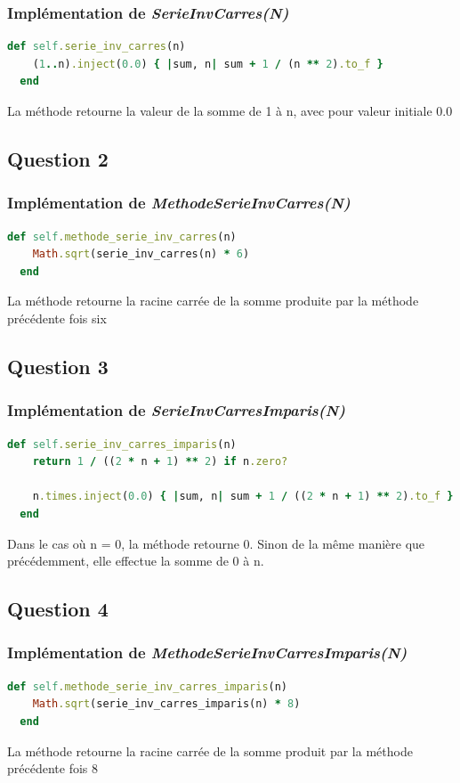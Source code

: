 \documentclass[a4paper,10pt]{report}
\begin{document}
\subsubsection{Implémentation de \textit{SerieInvCarres(N)}}
\begin{lstlisting}[language=Ruby]
  def self.serie_inv_carres(n)
    (1..n).inject(0.0) { |sum, n| sum + 1 / (n ** 2).to_f }
  end
\end{lstlisting}
La méthode retourne la valeur de la somme de 1 à n, avec pour valeur initiale 0.0
\bigskip

\subsection{Question 2}
\subsubsection{Implémentation de \textit{MethodeSerieInvCarres(N)}}
\begin{lstlisting}[language=Ruby]
  def self.methode_serie_inv_carres(n)
    Math.sqrt(serie_inv_carres(n) * 6)
  end
\end{lstlisting}
La méthode retourne la racine carrée de la somme produite par la méthode précédente fois six
\bigskip

\subsection{Question 3}
\subsubsection{Implémentation de \textit{SerieInvCarresImparis(N)}}
\begin{lstlisting}[language=Ruby]
  def self.serie_inv_carres_imparis(n)
    return 1 / ((2 * n + 1) ** 2) if n.zero?

    n.times.inject(0.0) { |sum, n| sum + 1 / ((2 * n + 1) ** 2).to_f }
  end
\end{lstlisting}
Dans le cas où n = 0, la méthode retourne 0. Sinon de la même manière que précédemment, elle effectue la somme de 0 à n.
\bigskip

\subsection{Question 4}
\subsubsection{Implémentation de \textit{MethodeSerieInvCarresImparis(N)}}
\begin{lstlisting}[language=Ruby]
  def self.methode_serie_inv_carres_imparis(n)
    Math.sqrt(serie_inv_carres_imparis(n) * 8)
  end
\end{lstlisting}
La méthode retourne la racine carrée de la somme produit par la méthode précédente fois 8
\bigskip
\end{document}
